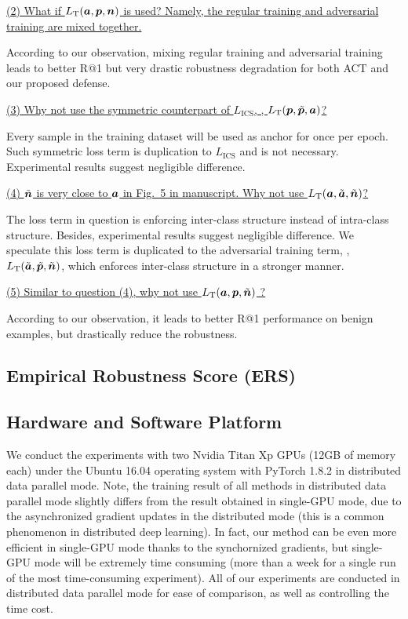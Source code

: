 \ul{(2) What if $L_\text{T}({\bm{a}}, {\bm{p}}, {\bm{n}})$ is used? Namely, the regular training
and adversarial training are mixed together.}

According to our observation, mixing regular training and adversarial training
leads to better R@1 but very drastic robustness degradation for both ACT and
our proposed defense.

\ul{(3) Why not use the symmetric counterpart of $L_\text{ICS}$, \ie,
		$L_\text{T}({\bm{p}}, \tilde{{\bm{p}}}, {\bm{a}})$?}

Every sample in the training dataset will be used as anchor for once per
epoch.
%
Such symmetric loss term is duplication to $L_\text{ICS}$ and is
not necessary.
%
Experimental results suggest negligible difference.

\ul{(4) $\tilde{{\bm{n}}}$ is very close to ${\bm{a}}$ in Fig.~5 in manuscript.
Why not use $L_\text{T}({\bm{a}}, \tilde{{\bm{a}}}, \tilde{{\bm{n}}})$?}

The loss term in question is enforcing inter-class structure instead of
intra-class structure.
%
Besides, experimental results suggest negligible difference.
%
We speculate this loss term is duplicated to the adversarial training term,
\ie, $L_\text{T}(\tilde{{\bm{a}}}, \tilde{{\bm{p}}}, \tilde{{\bm{n}}})$, which enforces
inter-class structure in a stronger manner.

\ul{(5) Similar to question (4), why not use $L_\text{T}({\bm{a}}, {\bm{p}}, \tilde{{\bm{n}}})$ ?}

According to our observation, it leads to better R@1 performance on benign
examples, but drastically reduce the robustness.

\subsection{Empirical Robustness Score (ERS)}

\subsection{Hardware and Software Platform}

We conduct the experiments with two Nvidia Titan Xp GPUs (12GB of memory each)
under the Ubuntu 16.04 operating system with PyTorch 1.8.2 in distributed data
parallel mode.
%
Note, the training result of all methods in distributed data parallel mode
slightly differs from the result obtained in single-GPU mode, due to the
asynchronized gradient updates in the distributed mode (this is a common
phenomenon in distributed deep learning).
%
In fact, our method can be even more efficient in single-GPU mode thanks to the
synchornized gradients, but single-GPU mode will be extremely time consuming
(more than a week for a single run of the most time-consuming experiment).
%
All of our experiments are conducted in distributed data parallel mode for ease
of comparison, as well as controlling the time cost.

